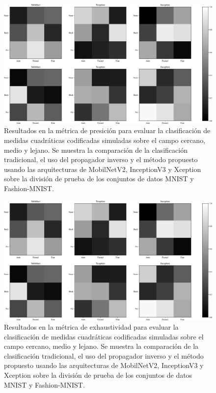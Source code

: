 \begin{figure}[!h]
    \centering
    \includegraphics[width=\linewidth]{images/test_result_pre.pdf}
    \caption{Resultados en la métrica de presición para evaluar la clasificación de medidas cuadráticas codificadas simuladas sobre el campo cercano, medio y lejano. Se muestra la comparación de la clasificación tradicional, el uso del propagador inverso y el método propuesto usando las arquitecturas de MobilNetV2, InceptionV3 y Xception sobre la división de prueba de los conjuntos de datos MNIST y Fashion-MNIST.}
    \label{fig:results_pre}
\end{figure}



\begin{figure}[!h]
    \centering
    \includegraphics[width=\linewidth]{images/test_result_rec.pdf}
    \caption{Resultados en la métrica de exhaustividad para evaluar la clasificación de medidas cuadráticas codificadas simuladas sobre el campo cercano, medio y lejano. Se muestra la comparación de la clasificación tradicional, el uso del propagador inverso y el método propuesto usando las arquitecturas de MobilNetV2, InceptionV3 y Xception sobre la división de prueba de los conjuntos de datos MNIST y Fashion-MNIST.}
    \label{fig:results_rec}
\end{figure}

